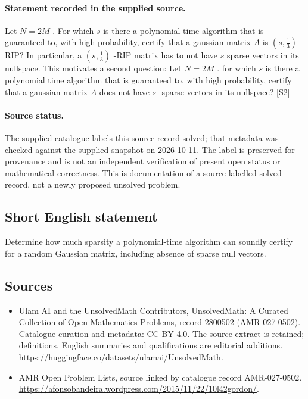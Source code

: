\documentclass[11pt]{article}
\begin{document}
\paragraph{Statement recorded in the supplied source.}
Let $N = 2M$ . For which $s$ is there a polynomial time algorithm that is guaranteed to, with high probability, certify that a gaussian matrix $A$ is $\left(s,\frac13\right)$ -RIP? In particular, a $\left(s,\frac13\right)$ -RIP matrix has to not have $s$ sparse vectors in its nullspace. This motivates a second question: Let $N = 2M$ . for which $s$ is there a polynomial time algorithm that is guaranteed to, with high probability, certify that a gaussian matrix $A$ does not have $s$ -sparse vectors in its nullspace? \href{https://afonsobandeira.wordpress.com/2015/11/22/10l42gordon/}{[S2]}
\paragraph{Source status.}
The supplied catalogue labels this source record solved; that metadata was checked against the supplied snapshot on 2026-10-11. The label is preserved for provenance and is not an independent verification of present open status or mathematical correctness. This is documentation of a source-labelled solved record, not a newly proposed unsolved problem.
\subsection{Short English statement}
Determine how much sparsity a polynomial-time algorithm can soundly certify for a random Gaussian matrix, including absence of sparse null vectors.
\subsection{Sources}
\begin{itemize}
\item[S1] Ulam AI and the UnsolvedMath Contributors, UnsolvedMath: A Curated Collection of Open Mathematics Problems, record 2800502 (AMR-027-0502). Catalogue curation and metadata: CC BY 4.0. The source extract is retained; definitions, English summaries and qualifications are editorial additions.
\url{https://huggingface.co/datasets/ulamai/UnsolvedMath}.
\item[S2] AMR Open Problem Lists, source linked by catalogue record AMR-027-0502.
\url{https://afonsobandeira.wordpress.com/2015/11/22/10l42gordon/}.
\end{itemize}
\end{document}
